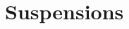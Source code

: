 \documentclass[hott-all.tex]{subfiles}
\begin{document}
% 
% 
\section{Suspensions}
% 
% 
\end{document}
